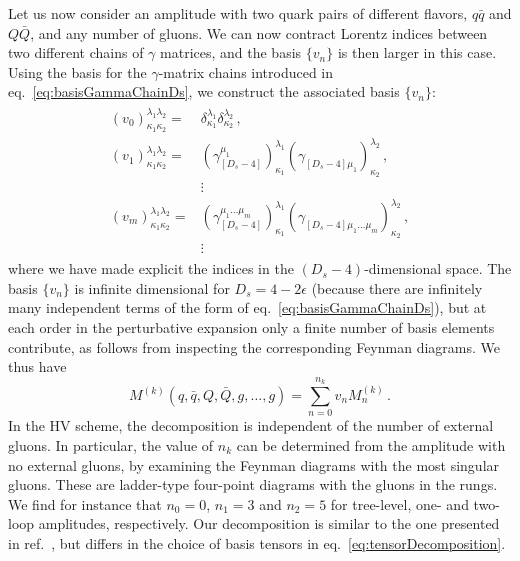 Let us now consider an amplitude with two quark pairs of 
different flavors, $q\bar q$ and $Q\bar Q$, and any number of
gluons. We can now contract Lorentz indices between two 
different chains of $\gamma$ matrices, and the basis 
$\{v_n\}$ is then larger in this case. Using the basis for the
$\gamma$-matrix chains introduced in 
eq.~\eqref{eq:basisGammaChainDs}, we construct the associated
basis $\{v_n\}$:
\begin{align}
  \begin{split} \label{eqn:4qtensors}
    (v_0)_{\kappa_1\kappa_2}^{\lambda_1\lambda_2}   = &
    \delta_{\kappa_1}^{\lambda_1} \delta_{\kappa_2}^{\lambda_2}\,, \\
    (v_1)_{\kappa_1\kappa_2}^{\lambda_1\lambda_2}=
    &(\gamma_{[D_s-4]}^{\mu_1} )_{\kappa_1}^{\lambda_1} 
    (\gamma_{[D_s-4]\mu_1}^{\phantom{\mu}})_{\kappa_2}^{\lambda_2}\,, \\
    & \vdots\\
    (v_m)_{\kappa_1\kappa_2}^{\lambda_1\lambda_2}=
    &(\gamma_{[D_s-4]}^{\mu_1 \ldots  \mu_m})_{\kappa_1}^{\lambda_1}
    (\gamma_{[D_s-4]\mu_1 \ldots \mu_m}^{\phantom{\mu}})_{\kappa_2}^{\lambda_2}\,,\\
    & \vdots\,
  \end{split}
\end{align}
where we have made explicit the indices in the $
(D_s-4)$-dimensional space.
The basis $\{v_n\}$ is infinite dimensional for
$D_s=4-2\epsilon$ (because there are infinitely many independent
terms of the form of eq.~\eqref{eq:basisGammaChainDs}), but at
each order in the perturbative
expansion only a finite number of basis elements contribute, 
as follows from inspecting the corresponding Feynman diagrams.
We thus have
\begin{equation} \label{eqn:4qampltensor}
	M^{(k)} (q,\bar q,Q,\bar Q,g,\ldots,g) =\sum_{n=0}^{n_k} v_n M^{(k)}_n\,.
\end{equation}
In the HV scheme, the decomposition is independent of the number
of external gluons. In particular,
the value of $n_k$ can be determined from the amplitude with no 
external gluons, by examining the Feynman diagrams
with the most singular gluons. 
These are ladder-type four-point diagrams with the 
gluons in the rungs. We find for instance that $n_0=0$,
$n_1=3$ and $n_2=5$ for tree-level, one- and two-loop
amplitudes, respectively. Our decomposition is similar to the 
one presented in ref.~\cite{Glover:2004si}, but differs in the
choice of basis tensors in eq.~\eqref{eq:tensorDecomposition}.

